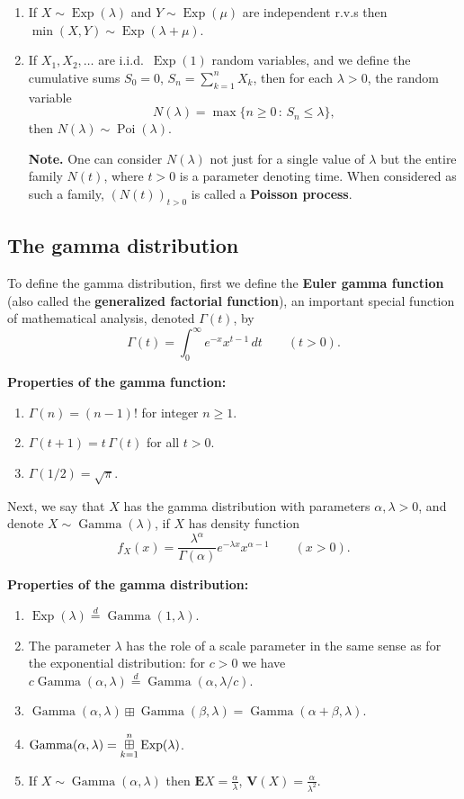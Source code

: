 \documentclass[12pt]{article}
\newcommand{\expec}{\mathbf{E}}
\newcommand{\var}{\mathbf{V}}
\newcommand{\eqdist}{\stackrel{d}{=}}
\newcommand{\indplus}{\boxplus}
\newcommand{\indsum}{\displaystyle \mathop{\boxplus}\displaylimits}
\newcommand{\poissondist}{\operatorname{Poi}}
\newcommand{\expdist}{\operatorname{Exp}}
\newcommand{\gammadist}{\operatorname{Gamma}}
\theoremstyle{example}
\begin{document}
\begin{enumerate}
\item If $X\sim \expdist(\lambda)$ and $Y \sim \expdist(\mu)$ are independent r.v.s then $\min(X,Y) \sim \expdist(\lambda+\mu)$.

\item If $X_1,X_2,\ldots $ are i.i.d.\ $\expdist(1)$ random variables, and we define the cumulative sums $S_0=0$, $S_n = \sum_{k=1}^n X_k$, then for each $\lambda>0$, the random variable
$$ N(\lambda) = \max\{ n\ge 0\,:\, S_n \le \lambda \}, $$
then $N(\lambda) \sim \poissondist(\lambda)$.

\textbf{Note.} One can consider $N(\lambda)$ not just for a single value of $\lambda$ but the entire family $N(t)$, where $t>0$ is a parameter denoting time. When considered as such a family, $(N(t))_{t>0}$ is called a \textbf{Poisson process}.


\end{enumerate}


\subsection{The gamma distribution}

To define the gamma distribution, first we define the \textbf{Euler gamma function} (also called the \textbf{generalized factorial function}), an important special function of mathematical analysis, denoted $\Gamma(t)$, by
$$
\Gamma(t) = \int_0^\infty e^{-x} x^{t-1}\,dt \qquad (t>0).
$$

\noindent \textbf{Properties of the gamma function:}
\begin{enumerate}
\item $\Gamma(n)=(n-1)!$ for integer $n\ge1$.
\item $\Gamma(t+1) = t\, \Gamma(t)$ for all $t>0$.
\item $\Gamma(1/2)=\sqrt{\pi}$.
\end{enumerate}

Next, we say that $X$ has the gamma distribution with parameters $\alpha, \lambda>0$, and denote $X\sim \gammadist(\lambda)$, if $X$ has density function
$$
f_X(x) = \frac{\lambda^\alpha}{\Gamma(\alpha)} e^{-\lambda x} x^{\alpha-1} \qquad (x>0).
$$

\noindent \textbf{Properties of the gamma distribution:}
\begin{enumerate}
\item $\expdist(\lambda) \eqdist \gammadist(1,\lambda)$.
\item The parameter $\lambda$ has the role of a scale parameter in the same sense as for the exponential distribution: for $c>0$ we have $c \gammadist(\alpha,\lambda) \eqdist \gammadist(\alpha, \lambda/c)$.
\item $\gammadist(\alpha,\lambda) \indplus \gammadist(\beta,\lambda) = \gammadist(\alpha+\beta,\lambda)$.
\item $\gammadist(\alpha,\lambda) = \indsum_{k=1}^n \expdist(\lambda)$.

\item If $X\sim \gammadist(\alpha,\lambda)$ then $\expec X = \frac{\alpha}{\lambda}$, $\var(X) = \frac{\alpha}{\lambda^2}$.
\end{enumerate}
\end{document}
